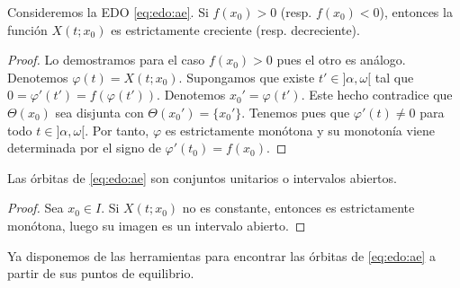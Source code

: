 \documentclass{article}
\begin{document}
\begin{proposition} \label{prop:ae:monotonia} Consideremos la EDO \eqref{eq:edo:ae}. Si $f(x_0) > 0$
  (resp. $f(x_0) < 0$), entonces la función $X(t; x_0)$ es estrictamente creciente
  (resp. decreciente).
\end{proposition}
\begin{proof}
  Lo demostramos para el caso $f(x_0) > 0$ pues el otro es análogo. Denotemos
  $\varphi(t) = X(t;x_0)$. Supongamos que existe $t' \in ]\alpha,\omega[$ tal que
  $0 = \varphi'(t') = f(\varphi(t'))$. Denotemos $x_0' = \varphi(t')$. Este hecho contradice que
  $\Theta(x_0)$ sea disjunta con $\Theta(x_0') = \{x_0'\}$. Tenemos pues que $\varphi'(t) \ne 0$
  para todo $t \in ]\alpha,\omega[$. Por tanto, $\varphi$ es estrictamente monótona y su monotonía
  viene determinada por el signo de $\varphi'(t_0) = f(x_0)$.
\end{proof}

\begin{corollary}
  Las órbitas de \eqref{eq:edo:ae} son conjuntos unitarios o intervalos abiertos.
\end{corollary}
\begin{proof}
  Sea $x_0 \in I$. Si $X(t;x_0)$ no es constante, entonces es estrictamente monótona, luego su
  imagen es un intervalo abierto.
\end{proof}

Ya disponemos de las herramientas para encontrar las órbitas de \eqref{eq:edo:ae} a partir de sus
puntos de equilibrio.
\end{document}
